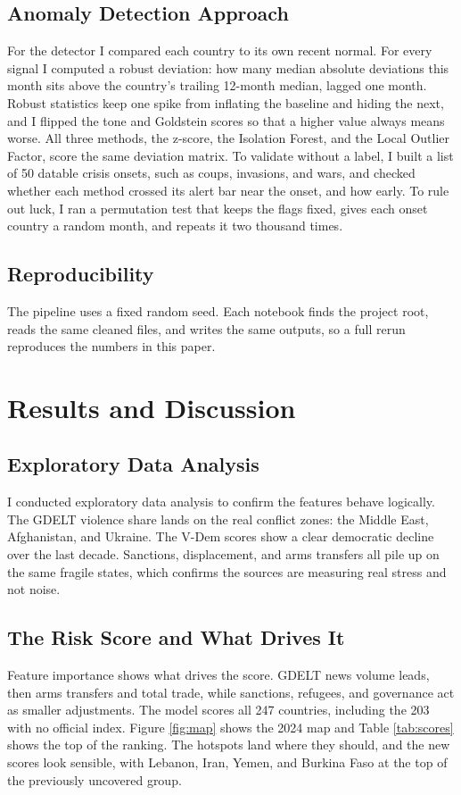 \documentclass[stu,12pt,floatsintext]{apa7}
\begin{document}
\subsection{Anomaly Detection Approach}
For the detector I compared each country to its own recent normal. For every signal I computed a robust deviation: how many median absolute deviations this month sits above the country's trailing 12-month median, lagged one month. Robust statistics keep one spike from inflating the baseline and hiding the next, and I flipped the tone and Goldstein scores so that a higher value always means worse. All three methods, the z-score, the Isolation Forest, and the Local Outlier Factor, score the same deviation matrix. To validate without a label, I built a list of 50 datable crisis onsets, such as coups, invasions, and wars, and checked whether each method crossed its alert bar near the onset, and how early. To rule out luck, I ran a permutation test that keeps the flags fixed, gives each onset country a random month, and repeats it two thousand times.

\subsection{Reproducibility}
The pipeline uses a fixed random seed. Each notebook finds the project root, reads the same cleaned files, and writes the same outputs, so a full rerun reproduces the numbers in this paper.

\section{Results and Discussion}
\subsection{Exploratory Data Analysis}
I conducted exploratory data analysis to confirm the features behave logically. The GDELT violence share lands on the real conflict zones: the Middle East, Afghanistan, and Ukraine. The V-Dem scores show a clear democratic decline over the last decade. Sanctions, displacement, and arms transfers all pile up on the same fragile states, which confirms the sources are measuring real stress and not noise.

\subsection{The Risk Score and What Drives It}
Feature importance shows what drives the score. GDELT news volume leads, then arms transfers and total trade, while sanctions, refugees, and governance act as smaller adjustments. The model scores all 247 countries, including the 203 with no official index. Figure \ref{fig:map} shows the 2024 map and Table \ref{tab:scores} shows the top of the ranking. The hotspots land where they should, and the new scores look sensible, with Lebanon, Iran, Yemen, and Burkina Faso at the top of the previously uncovered group.
\end{document}
